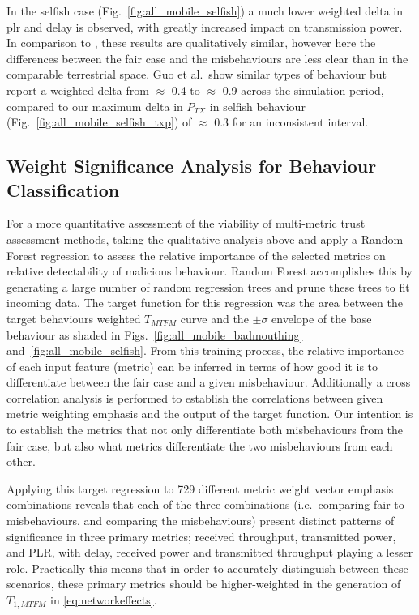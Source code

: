 In the selfish case (Fig.~\ref{fig:all_mobile_selfish}) a much lower weighted delta in \gls{plr} and delay is observed, with greatly increased impact on transmission power.
In comparison to \cite{Guo11}, these results are qualitatively similar, however here the differences between the fair case and the misbehaviours are less clear than in the comparable terrestrial space.
Guo et al.\ show similar types of behaviour but report a weighted delta from $\approx$ 0.4 to $\approx$ 0.9 across the simulation period, compared to our maximum delta in $P_{TX}$ in selfish behaviour (Fig.~\ref{fig:all_mobile_selfish_txp}) of $\approx$ 0.3 for an inconsistent interval.


\subsection{Weight Significance Analysis for Behaviour Classification}

For a more quantitative assessment of the viability of multi-metric trust assessment methods, taking the qualitative analysis above and apply a Random Forest regression \cite{Breiman2001} to assess the relative importance of the selected metrics on relative detectability of malicious behaviour. 
Random Forest accomplishes this by generating a large number of random regression trees and prune these trees to fit incoming data.
The target function for this regression was the area between the target behaviours weighted $T_{MTFM}$ curve and the $\pm\sigma$ envelope of the base behaviour as shaded in Figs.~\ref{fig:all_mobile_badmouthing} and~\ref{fig:all_mobile_selfish}.
From this training process, the relative importance of each input feature (metric) can be inferred in terms of how good it is to differentiate between the fair case and a given misbehaviour.
Additionally a cross correlation analysis is performed to establish the correlations between given metric weighting emphasis and the output of the target function.
Our intention is to establish the metrics that not only differentiate both misbehaviours from the fair case, but also what metrics differentiate the two misbehaviours from each other.

Applying this target regression to 729 different metric weight vector emphasis combinations reveals that each of the three combinations (i.e.\ comparing fair to misbehaviours, and comparing the misbehaviours) present distinct patterns of significance in three primary metrics; received throughput, transmitted power, and PLR, with delay, received power and transmitted throughput playing a lesser role.
Practically this means that in order to accurately distinguish between these scenarios, these primary metrics should be higher-weighted in the generation of $T_{1,MTFM}$ in \eqref{eq:networkeffects}.

